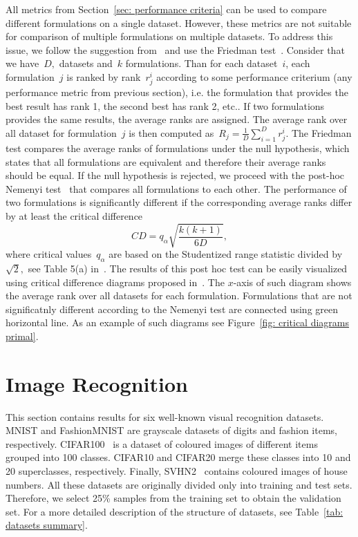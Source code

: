 All metrics from Section~\ref{sec: performance criteria} can be used to compare different formulations on a single dataset. However, these metrics are not suitable for comparison of multiple formulations on multiple datasets. To address this issue, we follow the suggestion from~\cite{demvsar2006statistical} and use the Friedman test~\cite{friedman1940comparison}. Consider that we have~$D,$ datasets and~$k$ formulations. Than for each dataset~$i$, each formulation~$j$ is ranked by rank~$r^i_j$ according to some performance criterium (any performance metric from previous section), i.e. the formulation that provides the best result has rank 1, the second best has rank 2, etc.. If two formulations provides the same results, the average ranks are assigned. The average rank over all dataset for formulation~$j$ is then computed as~$R_j = \frac{1}{D} \sum_{i = 1}^{D} r^{i}_{j}.$ The Friedman test compares the average ranks of formulations under the null hypothesis, which states that all formulations are equivalent and therefore their average ranks should be equal. If the null hypothesis is rejected, we proceed with the post-hoc Nemenyi test~\cite{nemenyi1963distribution} that compares all formulations to each other. The performance of two formulations is significantly different if the corresponding average
ranks differ by at least the critical difference
\begin{equation*}
  CD = q_{\alpha} \sqrt{\frac{k(k + 1)}{6D}},
\end{equation*}
where critical values~$q_{\alpha}$ are based on the Studentized range statistic divided by~$\sqrt{2},$ see Table 5(a) in~\cite{demvsar2006statistical}. The results of this post hoc test can be easily visualized using critical difference diagrams proposed in~\cite{demvsar2006statistical}.  The $x$-axis of such diagram shows the average rank over all datasets for each formulation. Formulations that are not significatnly different according to the Nemenyi test are connected using green horizontal line. As an example of such diagrams see Figure~\ref{fig: critical diagrams primal}.

\section{Image Recognition}

This section contains results for six well-known visual recognition datasets. MNIST \cite{deng2012mnist} and FashionMNIST \cite{xiao2017fashionmnist} are grayscale datasets of digits and fashion items, respectively. CIFAR100~\cite{krizhevsky2009learning} is a dataset of coloured images of different items grouped into 100 classes. CIFAR10 and CIFAR20 merge these classes into 10 and 20 superclasses, respectively. Finally, SVHN2~\cite{netzer2011reading} contains coloured images of house numbers. All these datasets are originally divided only into training and test sets. Therefore, we select 25\% samples from the training set to obtain the validation set. For a more detailed description of the structure of datasets, see Table~\ref{tab: datasets summary}.

